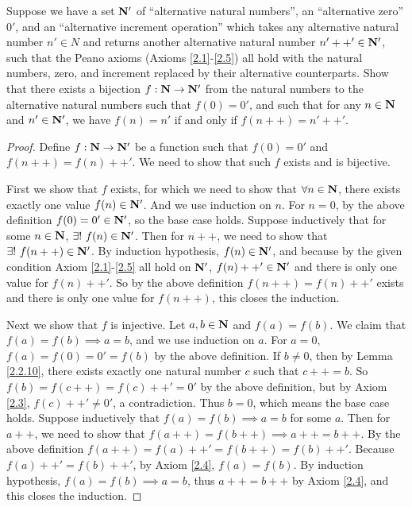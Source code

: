\begin{exercise}\label{ex 3.5.13}
    Suppose we have a set \(\mathbf{N}'\) of ``alternative natural numbers'', an ``alternative zero'' \(0'\), and an ``alternative increment operation'' which takes any alternative natural number \(n' \in N\) and returns another alternative natural number \(n'++' \in \mathbf{N}'\), such that the Peano axioms (Axioms \ref{2.1}-\ref{2.5}) all hold with the natural numbers, zero, and increment replaced by their alternative counterparts.
    Show that there exists a bijection \(f : \mathbf{N} \to \mathbf{N}'\) from the natural numbers to the alternative natural numbers such that \(f(0) = 0'\), and such that for any \(n \in \mathbf{N}\) and \(n' \in \mathbf{N}'\), we have \(f(n) = n'\) if and only if \(f(n++) = n'++'\).
\end{exercise}

\begin{proof}
    Define \(f : \mathbf{N} \to \mathbf{N}'\) be a function such that \(f(0) = 0'\) and \(f(n++) = f(n)++'\).
    We need to show that such \(f\) exists and is bijective.

    First we show that \(f\) exists, for which we need to show that \(\forall n \in \mathbf{N}\), there exists exactly one value \(f(n) \in \mathbf{N}'\).
    And we use induction on \(n\).
    For \(n = 0\), by the above definition \(f(0) = 0' \in \mathbf{N}'\), so the base case holds.
    Suppose inductively that for some \(n \in \mathbf{N}\), \(\exists!\ f(n) \in \mathbf{N}'\).
    Then for \(n++\), we need to show that \(\exists!\ f(n++) \in \mathbf{N}'\).
    By induction hypothesis, \(f(n) \in \mathbf{N}'\), and because by the given condition Axiom \ref{2.1}-\ref{2.5} all hold on \(\mathbf{N}'\), \(f(n)++' \in \mathbf{N}'\) and there is only one value for \(f(n)++'\).
    So by the above definition \(f(n++) = f(n)++'\) exists and there is only one value for \(f(n++)\), this closes the induction.

    Next we show that \(f\) is injective.
    Let \(a, b \in \mathbf{N}\) and \(f(a) = f(b)\).
    We claim that \(f(a) = f(b) \implies a = b\), and we use induction on \(a\).
    For \(a = 0\), \(f(a) = f(0) = 0' = f(b)\) by the above definition.
    If \(b \neq 0\), then by Lemma \ref{2.2.10}, there exists exactly one natural number \(c\) such that \(c++ = b\).
    So \(f(b) = f(c++) = f(c)++' = 0'\) by the above definition, but by Axiom \ref{2.3}, \(f(c)++' \neq 0'\), a contradiction.
    Thus \(b = 0\), which means the base case holds.
    Suppose inductively that \(f(a) = f(b) \implies a = b\) for some \(a\).
    Then for \(a++\), we need to show that \(f(a++) = f(b++) \implies a++ = b++\).
    By the above definition \(f(a++) = f(a)++' = f(b++) = f(b)++'\).
    Because \(f(a)++' = f(b)++'\), by Axiom \ref{2.4}, \(f(a) = f(b)\).
    By induction hypothesis, \(f(a) = f(b) \implies a = b\), thus \(a++ = b++\) by Axiom \ref{2.4}, and this closes the induction.


\end{proof}
